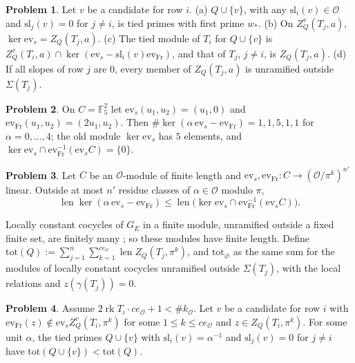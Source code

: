 \documentclass[reqno]{amsart}
\theoremstyle{definition}
\newtheorem{problem}{Problem}[section]
\theoremstyle{plain}
\newcommand{\F}{\mathbb{F}}
\newcommand{\Oc}{\mathcal{O}}
\newcommand{\rk}{\operatorname{rk}}
\newcommand{\len}{\operatorname{len}}
\newcommand{\Fr}{\mathrm{Fr}}
\newcommand{\sla}{\mathrm{sl}}
\newcommand{\ev}{\mathrm{ev}}
\newcommand{\tot}{\mathrm{tot}}
\begin{document}
\begin{problem}\label{pr:old}
Let \(v\) be a candidate for row \(i\).  \textup{(a)} \(Q \cup \{v\}\), with any \(\sla_i(v) \in \Oc\) and \(\sla_j(v) = 0\) for \(j \ne i\), is tied primes with first prime \(w_*\).  \textup{(b)} On \(Z^v_Q(T_j, a)\), \(\ker \ev_s = Z_Q(T_j, a)\).  \textup{(c)} The tied module of \(T_i\) for \(Q \cup \{v\}\) is \(Z^v_Q(T_i, a) \cap \ker(\ev_s - \sla_i(v)\ev_{\Fr})\), and that of \(T_j\), \(j \ne i\), is \(Z_Q(T_j, a)\).  \textup{(d)} If all slopes of row \(j\) are \(0\), every member of \(Z_Q(T_j, a)\) is unramified outside \(\Sigma(T_j)\).
\end{problem}

\begin{problem}\label{pr:tilt-example}
On \(C = \F_5^2\) let \(\ev_s(u_1, u_2) = (u_1, 0)\) and \(\ev_{\Fr}(u_1, u_2) = (2u_1, u_2)\).  Then \(\#\ker(\alpha\,\ev_s - \ev_{\Fr}) = 1, 1, 5, 1, 1\) for \(\alpha = 0, \dots, 4\); the old module \(\ker \ev_s\) has \(5\) elements, and \(\ker \ev_s \cap \ev_{\Fr}^{-1}(\ev_s C) = \{0\}\).
\end{problem}

\begin{problem}\label{pr:tilting}
Let \(C\) be an \(\Oc\)-module of finite length and \(\ev_s, \ev_{\Fr} \colon C \to (\Oc/\pi^k)^{n'}\) linear.  Outside at most \(n'\) residue classes of \(\alpha \in \Oc\) modulo \(\pi\),
\[
  \len \ker(\alpha\,\ev_s - \ev_{\Fr}) \le \len\bigl(\ker \ev_s \cap \ev_{\Fr}^{-1}(\ev_s C)\bigr).
\]
\end{problem}

Locally constant cocycles of \(G_E\) in a finite module, unramified outside a fixed finite set, are finitely many \cite[Thm.~8.3.20]{NSW}; so these modules have finite length.  Define \(\tot(Q) := \sum_{j=1}^n \sum_{k=1}^{ce_{\Oc}} \len Z_Q(T_j, \pi^k)\), and \(\tot_\varnothing\) as the same sum for the modules of locally constant cocycles unramified outside \(\Sigma(T_j)\), with the local relations and \(z(\gamma(T_j)) = 0\).

\begin{problem}\label{pr:decrease}
Assume \(2\rk T_i \cdot ce_{\Oc} + 1 < \#k_{\Oc}\).  Let \(v\) be a candidate for row \(i\) with \(\ev_{\Fr}(z) \notin \ev_s Z^v_Q(T_i, \pi^k)\) for some \(1 \le k \le ce_{\Oc}\) and \(z \in Z_Q(T_i, \pi^k)\).  For some unit \(\alpha\), the tied primes \(Q \cup \{v\}\) with \(\sla_i(v) = \alpha^{-1}\) and \(\sla_j(v) = 0\) for \(j \ne i\) have \(\tot(Q \cup \{v\}) < \tot(Q)\).
\end{problem}
\end{document}

